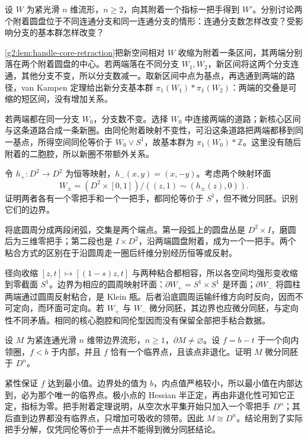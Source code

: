\begin{exercise}\label{g2:ex:one-handle-components}
	设 \(W\) 为紧光滑 \(n\) 维流形，\(n\ge2\)，向其附着一个指标一把手得到 \(W'\)。分别讨论两个附着圆盘位于不同连通分支和同一连通分支的情形：连通分支数怎样改变？受影响分支的基本群怎样改变？
\end{exercise}
\begin{solution}
	\cref{g2:lem:handle-core-retraction}把新空间相对 \(W\) 收缩为附着一条区间，其两端分别落在两个附着圆盘的中心。若两端落在不同分支 \(W_1,W_2\)，新区间将这两个分支连通，其他分支不变，所以分支数减一。取新区间中点为基点，再选通到两端的路径，van Kampen 定理给出新分支基本群 \(\pi_1(W_1)*\pi_1(W_2)\)：两端的交叠是可缩的短区间，没有增加关系。

	若两端都在同一分支 \(W_0\)，分支数不变。选择 \(W_0\) 中连接两端的道路；新核心区间与这条道路合成一条新圈。由同伦附着映射不变性，可沿这条道路把两端都移到同一基点，所得空间同伦等价于 \(W_0\vee S^1\)，故基本群为 \(\pi_1(W_0)*\mathbb Z\)。这里没有随后附着的二胞腔，所以新圈不带额外关系。
\end{solution}

\begin{exercise}\label{g2:ex:disk-mapping-torus-handles}
	令 \(h_+:D^2\to D^2\) 为恒等映射，\(h_-(x,y)=(x,-y)\)。考虑两个映射环面
	\[
		W_\pm=(D^2\times[0,1])/((z,1)\sim(h_\pm(z),0)).
	\]
	证明两者各有一个零把手和一个一把手，都同伦等价于 \(S^1\)，但不微分同胚。识别它们的边界。
\end{exercise}
\begin{solution}
	将底圆周分成两段闭弧，交集是两个端点。第一段弧上的圆盘丛是 \(D^2\times I\)，磨圆后为三维零把手；第二段也是 \(I\times D^2\)，沿两端圆盘附着，成为一个一把手。两个粘合方式的区别在于沿圆周走一圈后纤维分别经历恒等或反射。

	径向收缩 \([z,t]\mapsto[(1-s)z,t]\) 与两种粘合都相容，所以各空间均强形变收缩到零截面 \(S^1\)。边界为相应的圆周映射环面：\(\partial W_+=S^1\times S^1\) 是环面；\(\partial W_-\) 将圆柱两端通过圆周反射粘合，是 Klein 瓶。后者沿底圆周运输纤维方向时反向，因而不可定向，而环面可定向。若 \(W_+\) 与 \(W_-\) 微分同胚，其边界也应微分同胚，与定向性不同矛盾。相同的核心胞腔和同伦型因而没有保留全部把手粘合数据。
\end{solution}

\begin{exercise}\label{g2:ex:morse-single-critical-ball}
	设 \(M\) 为紧连通光滑 \(n\) 维带边界流形，\(n\ge1\)，\(\partial M\ne\varnothing\)。设 \(f=b-t\) 于一个向内领圈，\(f<b\) 于内部，并且 \(f\) 恰有一个临界点，且该点非退化。证明 \(M\) 微分同胚于 \(D^n\)。
\end{exercise}
\begin{solution}
	紧性保证 \(f\) 达到最小值。边界处的值为 \(b\)，内点值严格较小，所以最小值在内部达到，必为那个唯一的临界点。极小点的 Hessian 半正定，再由非退化性可知它正定，指标为零。把手附着定理说明，从空次水平集开始只加入一个零把手 \(D^n\)；其后直到边界都没有临界点，只增加可吸收的领带。因此 \(M\cong D^n\)。结论用到了实际把手分解，仅凭同伦等价于一点并不能得到微分同胚结论。
\end{solution}

